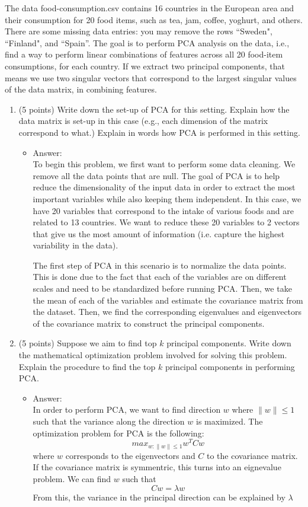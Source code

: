 \documentclass[twoside,10pt]{article}
\begin{document}
The data \textsf{food-consumption.csv} contains 16 countries in the European area and their consumption for 20 food items, such as tea, jam, coffee, yoghurt, and others. There are some missing data entries: you may remove the rows ``Sweden", ``Finland", and ``Spain''. The goal is to perform PCA analysis on the data, i.e., find a way to perform linear combinations of features across all 20 food-item consumptions, for each country. If we extract two principal components, that means we use two singular vectors that correspond to the largest singular values of the data matrix, in combining features. 
\begin{enumerate}
\item (5 points) Write down the set-up of PCA for this setting. Explain how the data matrix is set-up in this case (e.g., each dimension of the matrix correspond to what.) Explain in words how PCA is performed in this setting.
\begin{itemize}

\item Answer:\\
To begin this problem, we first want to perform some data cleaning. We remove all the data points that are null. The goal of PCA is to help reduce the dimensionality of the input data in order to extract the most important variables while also keeping them independent. In this case, we have 20 variables that correspond to the intake of various foods and are related to 13 countries. We want to reduce these 20 variables to 2 vectors that give us the most amount of information (i.e. capture the highest variability in the data).

The first step of PCA in this scenario is to normalize the data points. This is done due to the fact that each of the variables are on different scales and need to be standardized before running PCA. Then, we take the mean of each of the variables and estimate the covariance matrix from the dataset. Then, we find the corresponding eigenvalues and eigenvectors of the covariance matrix to construct the principal components.

\end{itemize} 
\item (5 points) Suppose we aim to find top $k$ principal components. Write down the mathematical optimization problem involved for solving this problem. Explain the procedure to find the top $k$ principal components in performing PCA. 
\begin{itemize}
\item Answer:\\
In order to perform PCA, we want to find direction $w$ where $\|w\| \leq 1$ such that the variance along the direction $w$ is maximized.
The optimization problem for PCA is the following:
$$max_{w:\|w\|\leq 1} w^TCw$$
where $w$ corresponds to the eigenvectors and $C$ to the covariance matrix.
If the covariance matrix is symmentric, this turns into an eignevalue problem. We can find $w$ such that 
$$Cw = \lambda w$$
From this, the variance in the principal direction can be explained by $\lambda$


\end{itemize}
\end{enumerate}
\end{document}
